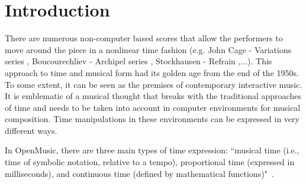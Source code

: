 \documentclass{article}
\title{\papertitle}
\begin{document}
%
\capstartfalse
\maketitle
\capstarttrue
%
\begin{abstract}
INScore is an environment for augmented interactive music score design,
oriented towards unconventional uses of music notation, without excluding conventional approaches. In this environment, although all the objects of a score have a temporal dimension, the time remains \emph{fixed} i.e., the date (or duration) of an object does not change, except
when a message is received (sent from an external application or resulting from events handling). Thus, INScore does not include a time manager in the classic sense of the term.
This choice was based on the fact that the system was originally designed 
to be used with sound production software (e.g., Max/MSP, Pure Data), that have more strict real-time constraints than INScore's graphical environment.
However, the need to introduce dynamic time has gradually emerged, leading to an original model, both \emph{continuous} and  \emph{event based}. The paper presents this model and its properties %
in the frame on INScore.
\end{abstract}
%


\section{Introduction}\label{sec:introduction}

There are numerous non­-computer based scores that allow the performers to move around the piece in a non­linear time fashion (e.g. John Cage - Variations series \cite{cage:var}, Boucourechliev - Archipel series \cite{boucou}, Stockhausen - Refrain \cite{stockhausen-refrain},...). This approach to time and musical form had its golden age from the end of the 1950s. To some extent, it can be seen as the premises of contemporary interactive music. It is emblematic of a musical thought that breaks with the traditional approaches of time and needs to be taken into account in computer environments for musical composition.
Time manipulations in these environments can be expressed in very different ways.

In OpenMusic, there are three main types of time expression: ``musical time (i.e., time of symbolic notation, relative to a tempo), proportional time (expressed in milliseconds), and continuous time (defined by mathematical functions)"~\cite{bresson08}.
\end{document}
